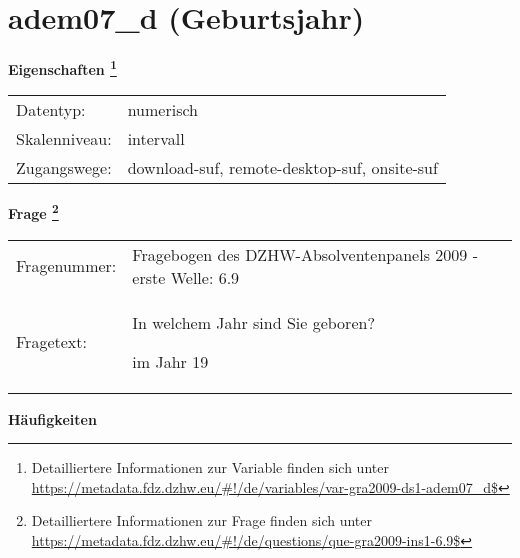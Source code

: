 
    \setcounter{footnote}{0}

    \vspace*{-1.8cm}
	\section{adem07\_d (Geburtsjahr)}
	\label{section:adem07_d}



    \vspace*{0.5cm}
    \noindent\textbf{Eigenschaften
	\footnote{Detailliertere Informationen zur Variable finden sich unter
		\url{https://metadata.fdz.dzhw.eu/\#!/de/variables/var-gra2009-ds1-adem07_d$}}}\\
	\begin{tabularx}{\hsize}{@{}lX}
	Datentyp: & numerisch \\
	Skalenniveau: & intervall \\
	Zugangswege: &
	  download-suf, 
	  remote-desktop-suf, 
	  onsite-suf
 \\
    \end{tabularx}



				\vspace*{0.5cm}
                \noindent\textbf{Frage
	                \footnote{Detailliertere Informationen zur Frage finden sich unter
		              \url{https://metadata.fdz.dzhw.eu/\#!/de/questions/que-gra2009-ins1-6.9$}}}\\
				\begin{tabularx}{\hsize}{@{}lX}
					Fragenummer: &
					  Fragebogen des DZHW-Absolventenpanels 2009 - erste Welle:
					  6.9
 \\
					Fragetext: & In welchem Jahr sind Sie geboren?\par  im Jahr 19 \\
				\end{tabularx}





        		\vspace*{0.5cm}
                \noindent\textbf{Häufigkeiten}


